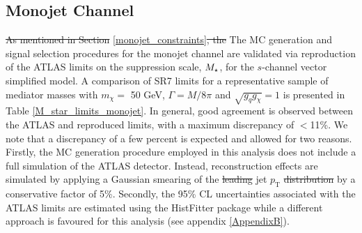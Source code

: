 \subsection{Monojet Channel}
\label{monojet_validation}
\begin{flushleft}
\st{As mentioned in Section }\ref{monojet_constraints}\st{, the} The MC generation and signal selection procedures for the monojet channel are validated via reproduction of the ATLAS limits on the suppression scale, $M_{\star}$, for the $s$-channel vector simplified model. A comparison of SR7 limits for a representative sample of mediator masses with $m_{\chi} = $ 50 GeV, $\Gamma = M/8\pi$ and $\sqrt{g_{q}g_{\chi}} = 1$ is presented in Table \ref{M_star_limits_monojet}. In general, good agreement is observed between the ATLAS and reproduced limits, with a maximum discrepancy of $<$11\%. We note that a discrepancy of a few percent is expected and allowed for two reasons. Firstly, the MC generation procedure employed in this analysis does not include a full simulation of the ATLAS detector. Instead, reconstruction effects are simulated by applying a Gaussian smearing of the \st{leading} jet $p_{\mathrm{T}}$ \st{distribution} by a conservative factor of 5\%. Secondly, the 95\% CL uncertainties associated with the ATLAS limits are estimated using the HistFitter package while a different approach is favoured for this analysis (see appendix \ref{AppendixB}). 




\end{flushleft}
